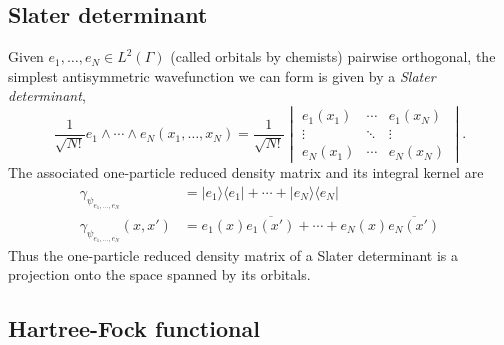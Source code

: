 \documentclass[11pt]{amsart}
\newcommand{\vocab}[1]{\emph{#1}}
\theoremstyle{definition}
\theoremstyle{definition}
\theoremstyle{definition}
\numberwithin{equation}{section}
\begin{document}
\subsection{Slater determinant}

Given $e_1,\ldots, e_N\in L^2(\Gamma)$ (called orbitals by chemists) pairwise orthogonal, the simplest antisymmetric wavefunction we can form is given by a \vocab{Slater determinant},
\begin{equation}
\frac{1}{\sqrt{N!}}e_1\wedge\cdots\wedge e_N(x_1,\ldots,x_N)=\frac{1}{\sqrt{N!}}\begin{vmatrix}
e_1(x_1)&\cdots &e_1(x_N)\\
\vdots&\ddots&\vdots\\
e_N(x_1)&\cdots&e_N(x_N)
\end{vmatrix}.
\end{equation}
The associated one-particle reduced density matrix and its integral kernel are
\begin{align}
\gamma_{\psi_{e_1,\ldots,e_N}}&=|e_1\rangle\langle e_1|+\cdots+|e_N\rangle\langle e_N|\\
\gamma_{\psi_{e_1,\ldots,e_N}}(x,x')&=e_1(x)\overline{e_1(x')}+\cdots+e_N(x)\overline{e_N(x')}
\end{align}
Thus the one-particle reduced density matrix of a Slater determinant is a projection onto the space spanned by its orbitals.

\subsection{Hartree-Fock functional}
\end{document}
